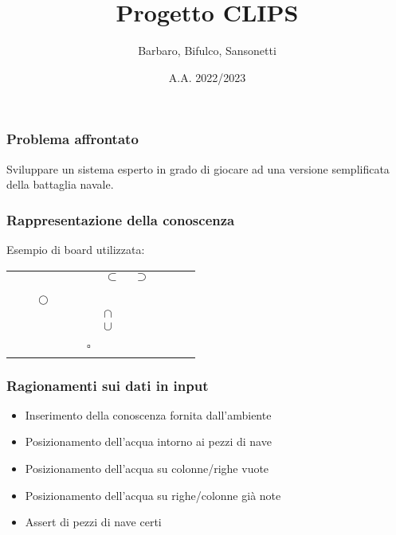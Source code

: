\documentclass[11pt]{beamer}
\author{Barbaro, Bifulco, Sansonetti}
\title{Progetto CLIPS}
\date{A.A. 2022/2023}
\institute[]{Università degli studi di Torino\\Intelligenza Artificiale e Laboratorio}
\begin{document}
\begin{frame}
\titlepage
\end{frame}


\begin{frame}
    \frametitle{Problema affrontato}
    Sviluppare un sistema esperto in grado di giocare ad una versione semplificata della battaglia navale.
\end{frame}

\begin{frame}
    \frametitle{Rappresentazione della conoscenza}
    Esempio di board utilizzata:
    \begin{table}
        \begin{tabular}{|l|l|l|l|l|l|l|l|l|l||l|}
        \hline
         &  &  &  &  &  &  &  &  &  & \\ \hline
         &  &  &  &  &  & $\subset$ & $\supset$ &  &  & \\ \hline
         &  &  &  &  &  &  &  &  &  & \\ \hline
         &  &  &  &  &  &  &  &  &  & \\ \hline
         &  & $\Circle$ &  &  &  &  &  &  &  & \\ \hline
         &  &  &  &  &  & $\cap$ &  &  &  & \\ \hline
         &  &  &  &  &  & $\cup$ &  &  &  & \\ \hline
         &  &  &  &  &  &  &  &  &  & \\ \hline
         &  &  &  &  &  &  &  &  &  & \\ \hline
         &  &  &  &  & $\square$ &  &  &  &  & \\ \hline \hline
         &  &  &  &  &  &  &  &  &  & \\ \hline
        \end{tabular}
    \end{table}
\end{frame}

\begin{frame}
    \frametitle{Ragionamenti sui dati in input}
    \begin{itemize}
        \item Inserimento della conoscenza fornita dall'ambiente
        \item Posizionamento dell'acqua intorno ai pezzi di nave
        \item Posizionamento dell'acqua su colonne/righe vuote
        \item Posizionamento dell'acqua su righe/colonne già note
        \item Assert di pezzi di nave certi
    \end{itemize}
\end{frame}
\end{document}
